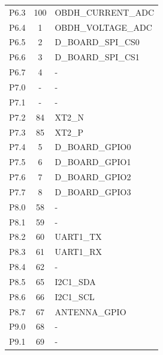 \begin{table}[!h]
\begin{tabular}{lcl}
        P6.3              & 100                 & OBDH\_CURRENT\_ADC    \\
        P6.4              & 1                   & OBDH\_VOLTAGE\_ADC    \\
        P6.5              & 2                   & D\_BOARD\_SPI\_CS0    \\
        P6.6              & 3                   & D\_BOARD\_SPI\_CS1    \\
        P6.7              & 4                   & -                     \\
        \midrule
        P7.0              & -                   & -                     \\
        P7.1              & -                   & -                     \\
        P7.2              & 84                  & XT2\_N                \\
        P7.3              & 85                  & XT2\_P                \\
        P7.4              & 5                   & D\_BOARD\_GPIO0       \\
        P7.5              & 6                   & D\_BOARD\_GPIO1       \\
        P7.6              & 7                   & D\_BOARD\_GPIO2       \\
        P7.7              & 8                   & D\_BOARD\_GPIO3       \\
        \midrule
        P8.0              & 58                  & -                     \\
        P8.1              & 59                  & -                     \\
        P8.2              & 60                  & UART1\_TX             \\
        P8.3              & 61                  & UART1\_RX             \\
        P8.4              & 62                  & -                     \\
        P8.5              & 65                  & I2C1\_SDA             \\
        P8.6              & 66                  & I2C1\_SCL             \\
        P8.7              & 67                  & ANTENNA\_GPIO         \\
        \midrule
        P9.0              & 68                  & -                     \\
        P9.1              & 69                  & -                     \\

\end{tabular}
\end{table}
